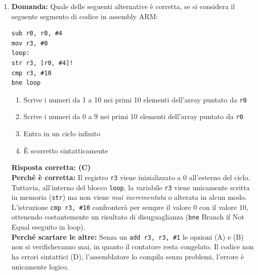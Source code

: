 \documentclass[12pt, a4paper]{article}
\begin{document}
\begin{enumerate}
    \item \textbf{Domanda:} Quale delle seguenti alternative è corretta, se si considera il seguente segmento di codice in assembly ARM:
\begin{verbatim}
sub r0, r0, #4
mov r3, #0
loop: 
str r3, [r0, #4]!
cmp r3, #10
bne loop
\end{verbatim}
    \begin{enumerate}[label=(\Alph*)]
        \item Scrive i numeri da 1 a 10 nei primi 10 elementi dell'array puntato da \texttt{r0}
        \item Scrive i numeri da 0 a 9 nei primi 10 elementi dell'array puntato da \texttt{r0}
        \item Entra in un ciclo infinito
        \item È scorretto sintatticamente
    \end{enumerate}
    \textbf{Risposta corretta: (C)} \\
    \textbf{Perché è corretta:} Il registro \texttt{r3} viene inizializzato a 0 all'esterno del ciclo. Tuttavia, all'interno del blocco \texttt{loop}, la variabile \texttt{r3} viene unicamente scritta in memoria (\texttt{str}) ma non viene \textit{mai incrementata} o alterata in alcun modo. L'istruzione \texttt{cmp r3, \#10} confronterà per sempre il valore $0$ con il valore $10$, ottenendo costantemente un risultato di disuguaglianza (\texttt{bne} Branch if Not Equal eseguito in loop). \\
    \textbf{Perché scartare le altre:} Senza un \texttt{add r3, r3, \#1} le opzioni (A) e (B) non si verificheranno mai, in quanto il contatore resta congelato. Il codice non ha errori sintattici (D), l'assemblatore lo compila senza problemi, l'errore è unicamente logico.


\end{enumerate}
\end{document}
